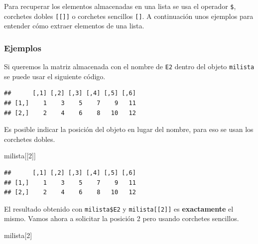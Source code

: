\documentclass[10pt,]{krantz}
\makeatletter
\newenvironment{Shaded}{\begin{snugshade}}{\end{snugshade}}
\newcommand{\DecValTok}[1]{\textcolor[rgb]{0.00,0.00,0.81}{#1}}
\newcommand{\OperatorTok}[1]{\textcolor[rgb]{0.81,0.36,0.00}{\textbf{#1}}}
\newcommand{\NormalTok}[1]{#1}
\newenvironment{kframe}{%
\medskip{}
\setlength{\fboxsep}{.8em}
 \def\at@end@of@kframe{}%
 \ifinner\ifhmode%
  \def\at@end@of@kframe{\end{minipage}}%
  \begin{minipage}{\columnwidth}%
 \fi\fi%
 \def\FrameCommand##1{\hskip\@totalleftmargin \hskip-\fboxsep
 \colorbox{shadecolor}{##1}\hskip-\fboxsep
     \hskip-\linewidth \hskip-\@totalleftmargin \hskip\columnwidth}%
 \MakeFramed {\advance\hsize-\width
   \@totalleftmargin\z@ \linewidth\hsize
   \@setminipage}}%
 {\par\unskip\endMakeFramed%
 \at@end@of@kframe}
\renewenvironment{Shaded}{\begin{kframe}}{\end{kframe}}
\makeatother
\begin{document}
Para recuperar los elementos almacenadas en una lista se usa el operador
\texttt{\$}, corchetes dobles \texttt{{[}{[}{]}{]}} o corchetes
sencillos \texttt{{[}{]}}. A continuación unos ejemplos para entender
cómo extraer elementos de una lista.

\subsubsection*{Ejemplos}\label{ejemplos-1}

Si queremos la matriz almacenada con el nombre de \texttt{E2} dentro del
objeto \texttt{milista} se puede usar el siguiente código.

\begin{Shaded}
\end{Shaded}

\begin{verbatim}
##      [,1] [,2] [,3] [,4] [,5] [,6]
## [1,]    1    3    5    7    9   11
## [2,]    2    4    6    8   10   12
\end{verbatim}

Es posible indicar la posición del objeto en lugar del nombre, para eso
se usan los corchetes dobles.

\begin{Shaded}
\begin{Highlighting}[]
\NormalTok{milista[[}\DecValTok{2}\NormalTok{]]}
\end{Highlighting}
\end{Shaded}

\begin{verbatim}
##      [,1] [,2] [,3] [,4] [,5] [,6]
## [1,]    1    3    5    7    9   11
## [2,]    2    4    6    8   10   12
\end{verbatim}

El resultado obtenido con \texttt{milista\$E2} y
\texttt{milista{[}{[}2{]}{]}} es \textbf{exactamente} el mismo. Vamos
ahora a solicitar la posición 2 pero usando corchetes sencillos.

\begin{Shaded}
\begin{Highlighting}[]
\NormalTok{milista[}\DecValTok{2}\NormalTok{]}
\end{Highlighting}
\end{Shaded}
\end{document}
